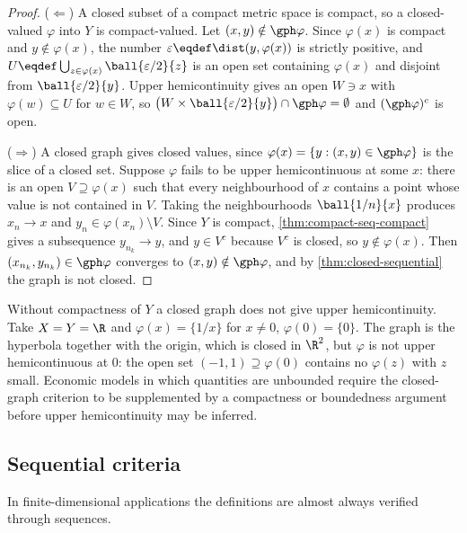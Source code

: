 \begin{proof}
	($\Leftarrow$) A closed subset of a compact metric space is compact, so a
	closed-valued $\varphi$ into $Y$ is compact-valued. Let
	$(x,y)\notin\gph\varphi$. Since $\varphi(x)$ is compact and $y\notin\varphi(x)$,
	the number $\varepsilon\eqdef\dist(y,\varphi(x))$ is strictly positive, and
	$U\eqdef\bigcup_{z\in\varphi(x)}\ball{\varepsilon/2}{z}$ is an open set
	containing $\varphi(x)$ and disjoint from $\ball{\varepsilon/2}{y}$. Upper
	hemicontinuity gives an open $W\ni x$ with $\varphi(w)\subseteq U$ for
	$w\in W$, so $\bigl(W\times\ball{\varepsilon/2}{y}\bigr)\cap\gph\varphi=\emptyset$
	and $(\gph\varphi)^{c}$ is open.

	($\Rightarrow$) A closed graph gives closed values, since
	$\varphi(x)=\{y : (x,y)\in\gph\varphi\}$ is the slice of a closed set. Suppose
	$\varphi$ fails to be upper hemicontinuous at some $x$: there is an open
	$V\supseteq\varphi(x)$ such that every neighbourhood of $x$ contains a point
	whose value is not contained in $V$. Taking the neighbourhoods
	$\ball{1/n}{x}$ produces $x_n\to x$ and $y_n\in\varphi(x_n)\setminus V$. Since
	$Y$ is compact, \autoref{thm:compact-seq-compact} gives a subsequence
	$y_{n_k}\to y$, and $y\in V^{c}$ because $V^{c}$ is closed, so
	$y\notin\varphi(x)$. Then $(x_{n_k},y_{n_k})\in\gph\varphi$ converges to
	$(x,y)\notin\gph\varphi$, and by \autoref{thm:closed-sequential} the graph is
	not closed.
\end{proof}

\begin{remark}\label{rem:closed-graph-compact}
	Without compactness of $Y$ a closed graph does not give upper hemicontinuity.
	Take $X=Y=\R$ and $\varphi(x)=\{1/x\}$ for $x\neq0$, $\varphi(0)=\{0\}$. The
	graph is the hyperbola together with the origin, which is closed in $\R^2$, but
	$\varphi$ is not upper hemicontinuous at $0$: the open set
	$(-1,1)\supseteq\varphi(0)$ contains no $\varphi(z)$ with $z$ small. Economic
	models in which quantities are unbounded require the closed-graph criterion to
	be supplemented by a compactness or boundedness argument before upper
	hemicontinuity may be inferred.
\end{remark}

\subsection{Sequential criteria}

In finite-dimensional applications the definitions are almost always verified
through sequences.

